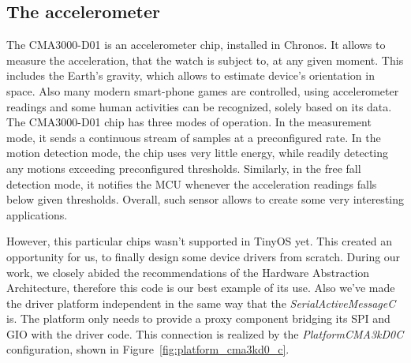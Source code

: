 \subsection{The accelerometer}

The CMA3000-D01 is an accelerometer chip, installed in Chronos. It allows to measure the acceleration, that the watch is subject to, at any given moment. This includes the Earth's gravity, which allows to estimate device's orientation in space. Also many modern smart-phone games are controlled, using accelerometer readings and some human activities can be recognized, solely based on its data. The CMA3000-D01 chip has three modes of operation. In the measurement mode, it sends a continuous stream of samples at a preconfigured rate. In the motion detection mode, the chip uses very little energy, while readily detecting any motions exceeding preconfigured thresholds. Similarly, in the free fall detection mode, it notifies the MCU whenever the acceleration readings falls below given thresholds. Overall, such sensor allows to create some very interesting applications.

However, this particular chips wasn't supported in TinyOS yet. This created an opportunity for us, to finally design some device drivers from scratch. During our work, we closely abided the recommendations of the Hardware Abstraction Architecture, therefore this code is our best example of its use. Also we've made the driver platform independent in the same way that the \emph{SerialActiveMessageC} is. The platform only needs to provide a proxy component bridging its SPI and GIO with the driver code.  This connection is realized by the \emph{PlatformCMA3kD0C} configuration, shown in Figure~\ref{fig:platform_cma3kd0_c}.

